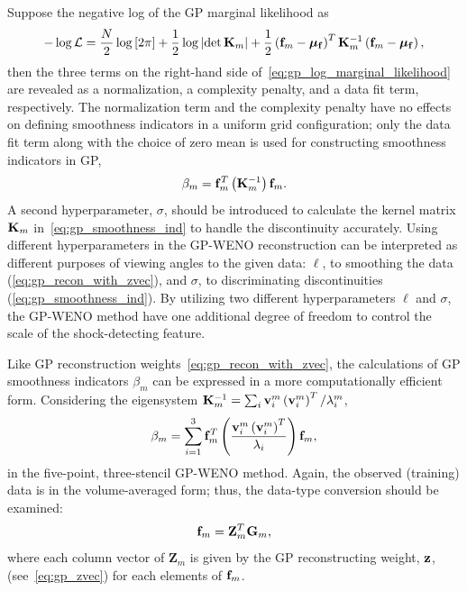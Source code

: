 Suppose the negative log of the GP marginal likelihood as
\begin{equation}\label{eq:gp_log_marginal_likelihood}
    -\log \mathcal{L} = \frac{N}{2} \log \left[ 2 \pi \right] + \frac{1}{2} \log \left| \det \mathbf{K}_{m} \right|
        + \frac{1}{2} \left( \mathbf{f}_{m} - \bm{\mu}_{\mathbf{f}} \right)^{T} \mathbf{K}_{m}^{-1} \left( \mathbf{f}_{m} - \bm{\mu}_{\mathbf{f}} \right),
\end{equation}
then the three terms on the right-hand side of~\cref{eq:gp_log_marginal_likelihood} are revealed as
a normalization, a complexity penalty, and a data fit term, respectively.
The normalization term and the complexity penalty have no effects on defining smoothness indicators
in a uniform grid configuration; only the data fit term along with the choice of zero mean is used
for constructing smoothness indicators in GP,
\begin{equation}\label{eq:gp_smoothness_ind}
    \beta_{m} = \mathbf{f}_{m}^{T} \left( \mathbf{K}^{-1}_{m} \right) \mathbf{f}_{m}.
\end{equation}
A second hyperparameter, \( \sigma \), should be introduced
to calculate the kernel matrix \( \mathbf{K}_{m} \) in~\cref{eq:gp_smoothness_ind}
to handle the discontinuity accurately.
Using different hyperparameters in the GP-WENO reconstruction
can be interpreted as different purposes of viewing angles to the given data:
\( \ell \), to smoothing the data (\cref{eq:gp_recon_with_zvec}),
and \( \sigma \), to discriminating discontinuities (\cref{eq:gp_smoothness_ind}).
By utilizing two different hyperparameters \( \ell \) and \( \sigma \),
the GP-WENO method have one additional degree of freedom
to control the scale of the shock-detecting feature.

Like GP reconstruction weights~\cref{eq:gp_recon_with_zvec}, the calculations of
GP smoothness indicators \( \beta_{m} \) can be expressed in a more computationally efficient form.
Considering the eigensystem \( \mathbf{K}_{m}^{-1} = \sum_{i} \mathbf{v}_{i}^{m} \left( \mathbf{v}_{i}^{m} \right)^{T}/\lambda_{i}^{m} \),
\begin{equation}\label{eq:gp_smoothness_ind_with_eig}
    \beta_{m} = \sum_{i=1}^{3} \mathbf{f}_{m}^{T} \left( \frac{\mathbf{v}_{i}^{m} \left( \mathbf{v}_{i}^{m} \right)^{T}}{\lambda_{i}} \right) \mathbf{f}_{m},
\end{equation}
in the five-point, three-stencil GP-WENO method\@.
Again, the observed (training) data is in the volume-averaged form;
thus, the data-type conversion should be examined:
\begin{equation}\label{}
    \mathbf{f}_{m} = \mathbf{Z}_{m}^{T} \mathbf{G}_{m},
\end{equation}
where each column vector of \( \mathbf{Z}_{m} \) is given by the GP reconstructing weight, \( \mathbf{z} \), (see~\cref{eq:gp_zvec})
for each elements of \( \mathbf{f}_{m} \).

